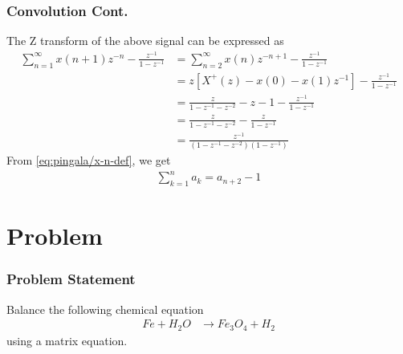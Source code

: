 \documentclass{beamer}
\providecommand{\sbrak}[1]{\ensuremath{{}\left[#1\right]}}
\providecommand{\brak}[1]{\ensuremath{\left(#1\right)}}
\theoremstyle{remark}
\newcommand{\myvec}[1]{\ensuremath{\begin{pmatrix}#1\end{pmatrix}}}
\let\vec\mathbf
\numberwithin{equation}{section}
\begin{document}
\begin{frame}
\frametitle{Convolution Cont.}
The Z transform of the above signal can be expressed as
\begin{align}
	\sum_{n = 1}^{\infty}x(n + 1) z^{-n} -\frac{z^{-1}}{1-z^{-1}}
	&=\sum_{n = 2}^{\infty}x(n) z^{-n+1} -\frac{z^{-1}}{1-z^{-1}}
	\\
	&=z\sbrak{X^{+}(z) - x(0) -x(1)z^{-1}} -\frac{z^{-1}}{1-z^{-1}}
	\\
	&= \frac{z}{1 - z^{-1} - z^{-2}} - z - 1 - \frac{z^{-1}}{1 - z^{-1}} \\
	&= \frac{z}{1 - z^{-1} - z^{-2}} -  \frac{z}{1 - z^{-1}} \\
	&=\frac{z^{-1}}{\brak{1 - z^{-1} - z^{-2}}\brak{1 - z^{-1}}} 
\end{align}
From \eqref{eq:pingala/x-n-def}, we get
\begin{align}
    \sum_{k = 1}^{n}a_k = a_{n+2} - 1
\end{align}
\end{frame}
%
%
\iffalse
\section{Problem}
\begin{frame}
\frametitle{Problem Statement}
%
Balance the following chemical equation
\begin{align}
\label{eq:chem_balance}
Fe+H_2O &\rightarrow Fe_3O_4 + H_2
\end{align}
%
using a matrix equation.
\end{frame}
\end{document}
